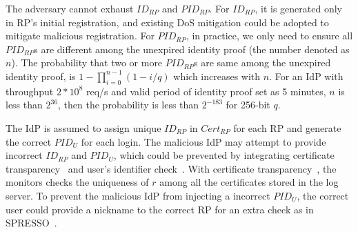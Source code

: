  The adversary cannot exhaust $ID_{RP}$ and $PID_{RP}$.
For $ID_{RP}$, it is generated only in RP's initial registration, and existing DoS mitigation  could be adopted to mitigate malicious registration.
For $PID_{RP}$,  in practice, we only need to ensure all $PID_{RP}$s are different among the unexpired identity proof (the number denoted as $n$). The probability
that two or more  $PID_{RP}$s are same among the unexpired identity proof, is $1-\prod_{i=0}^{n-1}(1-i/q)$ which increases with $n$. 
For an IdP with throughput $2*10^8$ req/s and valid period of identity proof set as 5 minutes, $n$ is less than $2^{36}$, then the probability is less than $2^{-183}$ for 256-bit $q$.

 The IdP is assumed to assign unique $ID_{RP}$ in $Cert_{RP}$ for each RP and generate the correct $PID_U$ for each login. The malicious IdP may attempt to provide incorrect $ID_{RP}$ and $PID_U$, which could be prevented by integrating certificate transparency~\cite{rfc6962} and user's identifier check~\cite{SPRESSO}. With certificate transparency~\cite{rfc6962}, the monitors  checks the uniqueness of $r$ among all the certificates stored in the log server. To prevent the malicious IdP from injecting a incorrect $PID_U$, the correct user could provide a nickname to the correct RP for an extra check as in SPRESSO~\cite{SPRESSO}.
  


